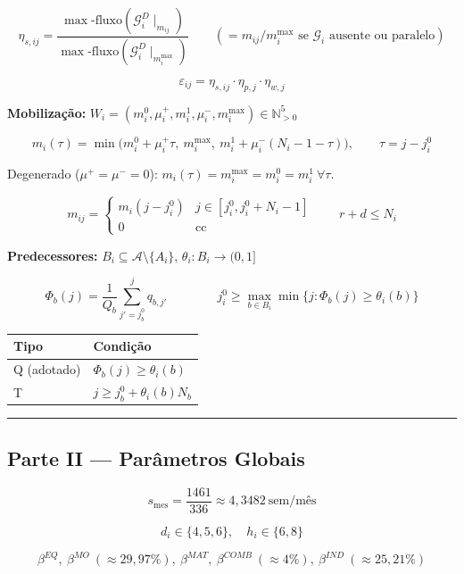 \documentclass[
  10pt,
]{article}
\begin{document}
\[\boxed{\eta_{s,ij} = \frac{\max\text{-fluxo}(\mathcal{G}_i^D\!\mid_{m_{ij}})}{\max\text{-fluxo}(\mathcal{G}_i^D\!\mid_{m_i^{\max}})}} \qquad (=m_{ij}/m_i^{\max}\text{ se }\mathcal{G}_i\text{ ausente ou paralelo})\]

\[\varepsilon_{ij} = \eta_{s,ij}\cdot\eta_{p,j}\cdot\eta_{w,j}\]

\textbf{Mobilização:}
\(W_i=(m_i^0,\mu_i^+,m_i^1,\mu_i^-,m_i^{\max})\in\mathbb{N}_{>0}^5\)

\[\boxed{m_i(\tau) = \min\!\big(m_i^0+\mu_i^+\tau,\ m_i^{\max},\ m_i^1+\mu_i^-(N_i-1-\tau)\big)}, \qquad \tau=j-j_i^0\]

Degenerado (\(\mu^+=\mu^-=0\)):
\(m_i(\tau)=m_i^{\max}=m_i^0=m_i^1\ \forall\tau\).

\[m_{ij} = \begin{cases}m_i(j-j_i^0) & j\in[j_i^0,j_i^0+N_i-1]\\0 & \text{cc}\end{cases} \qquad r+d\le N_i\]

\textbf{Predecessores:} \(B_i\subseteq\mathcal{A}\setminus\{A_i\}\),
\(\theta_i:B_i\to(0,1]\)

\[\Phi_b(j) = \frac{1}{Q_b}\sum_{j'=j_b^0}^{j}q_{b,j'} \qquad\qquad \boxed{j_i^0 \ge \max_{b\in B_i}\min\{j:\Phi_b(j)\ge\theta_i(b)\}}\]

\begin{longtable}[]{@{}ll@{}}
\toprule\noalign{}
Tipo & Condição \\
\midrule\noalign{}
\endhead
\bottomrule\noalign{}
\endlastfoot
Q (adotado) & \(\Phi_b(j)\ge\theta_i(b)\) \\
T & \(j\ge j_b^0+\theta_i(b)N_b\) \\
\end{longtable}

\begin{center}\rule{0.5\linewidth}{0.5pt}\end{center}

\hypertarget{parte-ii-paruxe2metros-globais}{%
\subsection{Parte II --- Parâmetros
Globais}\label{parte-ii-paruxe2metros-globais}}

\[s_{\text{mes}} = \frac{1461}{336}\approx4{,}3482\ \text{sem/mês}\]

\[d_i\in\{4,5,6\},\quad h_i\in\{6,8\}\]

\[\beta^{EQ},\ \beta^{MO}\ (\approx29{,}97\%),\ \beta^{MAT},\ \beta^{COMB}\ (\approx4\%),\ \beta^{IND}\ (\approx25{,}21\%)\]
\end{document}
